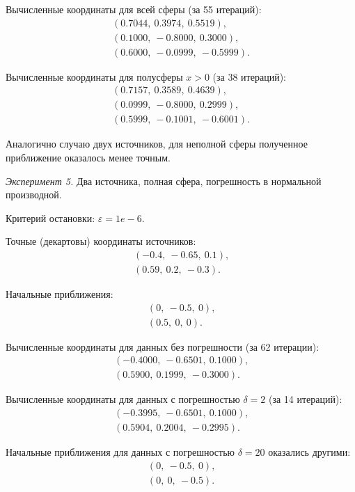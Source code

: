 \newpage
Вычисленные координаты для всей сферы (за 55 итераций):
\begin{align}
    (0.7044,\ 0.3974,\ 0.5519) \text{,}\nonumber\\
    (0.1000,\ -0.8000,\ 0.3000) \text{,}\nonumber\\
    (0.6000,\ -0.0999,\ -0.5999) \text{.}\nonumber
\end{align}

Вычисленные координаты для полусферы $x > 0$ (за 38 итераций):
\begin{align}
    (0.7157,\ 0.3589,\ 0.4639) \text{,}\nonumber\\
    (0.0999,\ -0.8000,\ 0.2999) \text{,}\nonumber\\
    (0.5999,\ -0.1001,\ -0.6001) \text{.}\nonumber
\end{align}

Аналогично случаю двух источников, для неполной сферы полученное приближение оказалось менее точным.

\emph{Эксперимент 5.} Два источника, полная сфера, погрешность в нормальной производной.

Критерий остановки: $\varepsilon = 1e-6$.

Точные (декартовы) координаты источников:
\begin{align}
(-0.4,\ -0.65,\ 0.1) \text{,}\nonumber\\
(0.59,\ 0.2,\ -0.3) \text{.}\nonumber
\end{align}

Начальные приближения:
\begin{align}
(0,\ -0.5,\ 0) \text{,}\nonumber\\
(0.5,\ 0,\ 0) \text{.}\nonumber
\end{align}

Вычисленные координаты для данных без погрешности (за 62 итерации):
\begin{align}
(-0.4000,\ -0.6501,\ 0.1000) \text{,}\nonumber\\
(0.5900,\ 0.1999,\ -0.3000) \text{.}\nonumber
\end{align}

Вычисленные координаты для данных с погрешностью $\delta=2$ (за 14 итераций):
\begin{align}
(-0.3995,\ -0.6501,\ 0.1000) \text{,}\nonumber\\
(0.5904,\ 0.2004,\ -0.2995) \text{.}\nonumber
\end{align}

Начальные приближения для данных с погрешностью $\delta=20$ оказались другими:
\begin{align}
(0,\ -0.5,\ 0) \text{,}\nonumber\\
(0,\ 0,\ -0.5) \text{.}\nonumber
\end{align}

